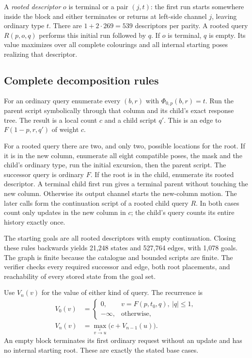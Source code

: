 \documentclass[11pt]{article}
\theoremstyle{definition}\newtheorem{definition}[theorem]{Definition}
\newcommand{\minusinf}{-\infty}
\begin{document}
A \emph{rooted descriptor} $o$ is terminal or a pair $(j,t)$: the first run
starts somewhere inside the block and either terminates or returns at left-side channel
$j$, leaving ordinary type $t$. There are $1+2\cdot269=539$ descriptors per
parity. A rooted query $R(p,o,q)$ performs this initial run followed by $q$.
If $o$ is terminal, $q$ is empty. Its value maximizes over all complete colourings
and all internal starting poses realizing that descriptor.

\subsection{Complete decomposition rules}
For an ordinary query enumerate every $(b,r)$ with $\Phi_{0,p}(b,r)=t$.
Run the parent script symbolically through that column and its child's exact
response tree. The result is a local count $c$ and a child script $q'$.
This is an edge to $F(1-p,r,q')$ of weight $c$.

For a rooted query there are two, and only two, possible locations for the root.
If it is in the new column, enumerate all eight compatible poses, the mask and
the child's ordinary type, run the initial excursion, then the parent script.
The successor query is ordinary $F$. If the root is in the child, enumerate
its rooted descriptor. A terminal child first run gives a terminal parent
without touching the new column. Otherwise its output channel starts the
new-column motion. The later calls form the continuation script of a rooted
child query $R$. In both cases count only updates in the new column in $c$;
the child's query counts its entire history exactly once.

The starting goals are all rooted descriptors with empty continuation. Closing
these rules backwards yields 21,248 states and 527,764 edges, with 1,078 goals.
The graph is finite because the catalogue and bounded scripts are finite.
The verifier checks every required successor and edge, both root placements,
and reachability of every stored state from the goal set.

Use $V_n(v)$ for the value of either kind of query. The recurrence is
\begin{align}
 V_0(v)&=\begin{cases}
 0,&v=F(p,t_0,q),\ |q|\le1,\\
 \minusinf,&\text{otherwise},
 \end{cases}\nonumber\\
 V_n(v)&=\max_{v\xrightarrow{c}u}\bigl(c+V_{n-1}(u)\bigr).\label{eq:dp}
\end{align}
An empty block terminates its first ordinary request without an update and
has no internal starting root. These are exactly the stated base cases.
\end{document}
